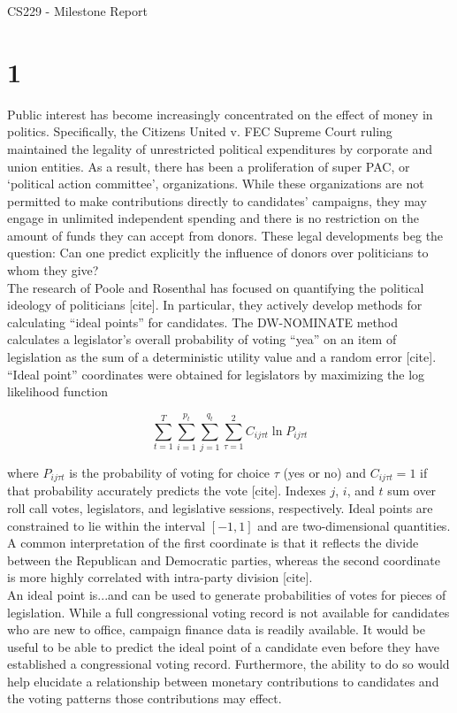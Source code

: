 \documentclass[10]{article}
\begin{document}
\begin{center}
CS229 - Milestone Report \\
\end{center}
\section*{1}
Public interest has become increasingly concentrated on the effect of money in politics. Specifically, the Citizens United v. FEC Supreme Court ruling maintained the legality of unrestricted political expenditures by corporate and union entities. As a result, there has been a proliferation of super PAC, or ‘political action committee’,  organizations. While these organizations are not permitted to make contributions directly to candidates’ campaigns, they may engage in unlimited independent spending and there is no restriction on the amount of funds they can accept from donors. These legal developments beg the question: Can one predict explicitly the influence of donors over politicians to whom they give? \\

The research of Poole and Rosenthal has focused on quantifying the political ideology of politicians [cite]. In particular, they actively develop methods for calculating “ideal points” for candidates. The DW-NOMINATE method calculates a legislator’s overall probability of voting “yea” on an item of legislation as the sum of a deterministic utility value and a random error [cite]. “Ideal point” coordinates were obtained for legislators by maximizing the log likelihood function

\[ \sum_{t=1}^{T} \sum_{i=1}^{p_t} \sum_{j=1}^{q_t} \sum_{\tau = 1}^{2} C_{ij \tau t} \ln P_{ij \tau t} \]

\noindent where $P_{ij \tau t}$ is the probability of voting for choice $\tau$ (yes or no) and $C_{ij \tau t} = 1$ if that probability accurately predicts the vote [cite]. Indexes $j$, $i$, and $t$ sum over roll call votes, legislators, and legislative sessions, respectively. Ideal points are constrained to lie within the interval $\left[ -1,1 \right]$ and are two-dimensional quantities. A common interpretation of the first coordinate is that it reflects the divide between the Republican and Democratic parties, whereas the second coordinate is more highly correlated with intra-party division [cite].\\

An ideal point is...and can be used to generate probabilities of votes for pieces of legislation. While a full congressional voting record is not available for candidates who are new to office, campaign finance data is readily available. It would be useful to be able to predict the ideal point of a candidate even before they have established a congressional voting record. Furthermore, the ability to do so would help elucidate a relationship between monetary contributions to candidates and the voting patterns those contributions may effect.\\
\end{document}
